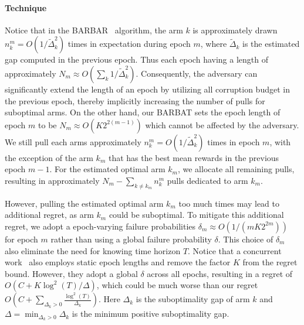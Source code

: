 \paragraph{Technique}
Notice that in the BARBAR~\citep{gupta2019better} algorithm,  the arm $k$ is approximately drawn $n_k^m=O(1 / \tilde\Delta_k^2)$ times in expectation during epoch $m$, where $\tilde\Delta_k$ is the estimated gap computed in the previous epoch. Thus each epoch having a length of approximately $N_m \approx O(\sum_{k} 1 / \tilde\Delta_k^2)$. Consequently, the adversary can significantly extend the length of an epoch by utilizing all corruption budget in the previous epoch, thereby implicitly increasing the number of pulls for suboptimal arms. On the other hand, our BARBAT sets the epoch length of epoch $m$ to be $N_m \approx O(K 2^{2(m-1)})$ which cannot be affected by the adversary.
We still pull each arms approximately $n_k^m=O(1 / \tilde\Delta_k^2)$ times in epoch $m$, with the exception of the arm $k_m$ that has the best mean rewards in the previous epoch $m-1$. For the estimated optimal arm $k_m$, we allocate all remaining pulls, resulting in approximately $N_m - \sum_{k \neq k_m} n_k^m$ pulls dedicated to arm $k_m$.

However, pulling the estimated optimal arm $k_m$ too much times may lead to additional regret, as arm $k_m$ could be suboptimal. To mitigate this additional regret, we adopt a epoch-varying failure probabilities $\delta_m\approx O(1/(mK2^{2m}))$ for epoch $m$ rather than using a global failure probability $\delta$. 
This choice of $\delta_m$ also eliminate the need for knowing time horizon $T$.
Notice that a concurrent work~\cite{ghaffari2024multi} also employs static epoch lengths and remove the factor $K$ from the regret bound. However, they adopt a global $\delta$ across  all epochs, resulting in a regret of $O(C+K\log^2(T)/\Delta)$, which could be much worse than our regret $O\left(C + \sum_{\Delta_k > 0}\frac{\log^2(T)}{\Delta_k}\right)$. Here $\Delta_k$ is the suboptimality gap of arm $k$ and $\Delta=\min_{\Delta_k>0}\Delta_k$ is the minimum positive suboptimality gap. 
